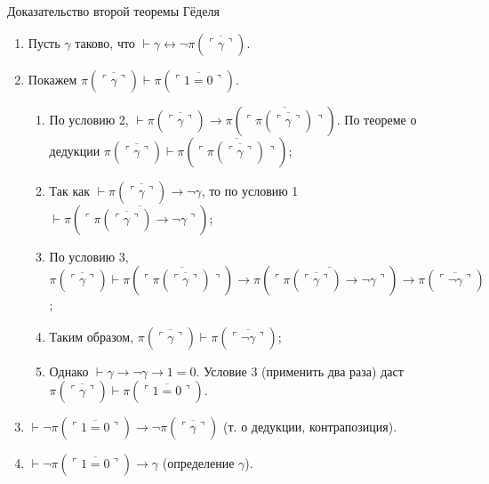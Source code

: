 \documentclass[aspectratio=169]{beamer}
\begin{document}
\begin{frame}{Доказательство второй теоремы Гёделя}
\begin{enumerate}
\item Пусть $\gamma$ таково, что $\vdash \gamma \leftrightarrow \neg\pi(\overline{\ulcorner\gamma\urcorner})$.
\item Покажем $\pi(\overline{\ulcorner\gamma\urcorner})\vdash \pi(\overline{\ulcorner 1=0\urcorner})$. 

\begin{enumerate}
\item По условию 2, $\vdash \pi(\overline{\ulcorner\gamma\urcorner}) \rightarrow \pi(\overline{\ulcorner\pi(\overline{\ulcorner\gamma\urcorner})\urcorner})$.
По теореме о дедукции $\pi(\overline{\ulcorner\gamma\urcorner})\vdash \pi(\overline{\ulcorner\pi(\overline{\ulcorner\gamma\urcorner})\urcorner})$;

\item Так как $\vdash \pi(\overline{\ulcorner\gamma\urcorner})\rightarrow\neg\gamma$, то 
по условию 1 $\vdash \pi(\overline{\ulcorner\pi(\overline{\ulcorner\gamma\urcorner})\rightarrow\neg\gamma\urcorner})$;

\item По условию 3, $\pi(\overline{\ulcorner\gamma\urcorner})\vdash \pi(\overline{\ulcorner\pi(\overline{\ulcorner\gamma\urcorner})\urcorner})
\rightarrow \pi(\overline{\ulcorner\pi(\overline{\ulcorner\gamma\urcorner})\rightarrow\neg\gamma\urcorner})\rightarrow
\pi(\overline{\ulcorner\neg\gamma\urcorner})$;

\item Таким образом, $\pi(\overline{\ulcorner\gamma\urcorner})\vdash\pi(\overline{\ulcorner\neg\gamma\urcorner})$;

\item Однако $\vdash \gamma\rightarrow\neg\gamma\rightarrow 1=0$. Условие 3 (применить два раза) даст $\pi(\overline{\ulcorner\gamma\urcorner})\vdash \pi(\overline{\ulcorner 1=0 \urcorner})$.
\end{enumerate}

\item $\vdash \neg\pi(\overline{\ulcorner 1=0 \urcorner})\rightarrow\neg\pi(\overline{\ulcorner\gamma\urcorner})$ (т. о дедукции, контрапозиция).
\item $\vdash \neg\pi(\overline{\ulcorner 1=0 \urcorner})\rightarrow\gamma$ (определение $\gamma$).
\end{enumerate}
\end{frame}
\end{document}
